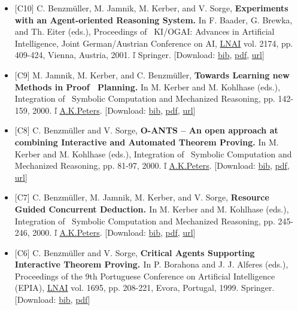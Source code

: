 \documentclass{article}
\newcommand{\tmtextbf}[1]{{\bfseries{#1}}}
\newenvironment{itemizedot}{\begin{itemize} \renewcommand{\labelitemi}{$\bullet$}\renewcommand{\labelitemii}{$\bullet$}\renewcommand{\labelitemiii}{$\bullet$}\renewcommand{\labelitemiv}{$\bullet$}}{\end{itemize}}
\begin{document}
\begin{itemizedot}
  \item {\small [C10] C. Benzm\"uller, M. Jamnik, M. Kerber, and V. Sorge,
  \tmtextbf{Experiments with an Agent-oriented Reasoning System.}} {\small In
  F. Baader, G. Brewka, and Th. Eiter (eds.), Proceedings of \ KI/OGAI:
  Advances in Artificial Intelligence, Joint German/Austrian Conference on AI,
  \href{http://www.springer.de/comp/lncs/}{LNAI} vol. 2174, pp. 409-424,
  Vienna, Austria, 2001.  \v{l}  Springer.} {\color{grey} [Download: {\small
  \href{../papers/C10.bib}{bib}, \href{../papers/C10.pdf}{pdf}}, {\small
  \href{http://link.springer.de/link/service/series/0558/bibs/2174/21740409.htm}{url}}]}
  
  \item {\small [C9] M. Jamnik, M. Kerber, and C. Benzm\"uller,
  \tmtextbf{Towards Learning new Methods in Proof \ Planning.}} {\small In M.
  Kerber and M. Kohlhase (eds.), Integration of \ Symbolic Computation and
  Mechanized Reasoning, pp. 142-159, 2000.  \v{l}
  \href{http://www.akpeters.com/}{A.K.Peters}.} {\color{grey} [Download:
  {\small \href{../papers/C9.bib}{bib}, \href{../papers/C9.pdf}{pdf}}, {\small
  \href{http://www.akpeters.com/product.asp?ProdCode=145}{url}}]}
  
  \item {\small [C8] C. Benzm\"uller and V. Sorge, \tmtextbf{O-ANTS -- An open
  approach at combining Interactive and Automated Theorem Proving.}} {\small
  In M. Kerber and M. Kohlhase (eds.), Integration of \ Symbolic Computation
  and Mechanized Reasoning, pp. 81-97, 2000.  \v{l}
  \href{http://www.akpeters.com/}{A.K.Peters}.} {\color{grey} [Download:
  {\small \href{../papers/C8.bib}{bib}, \href{../papers/C8.pdf}{pdf}}, {\small
  \href{http://www.akpeters.com/product.asp?ProdCode=145}{url}}]}
  
  \item {\small [C7] C. Benzm\"uller, M. Jamnik, M. Kerber, and V. Sorge,
  \tmtextbf{Resource Guided Concurrent Deduction. }In M. Kerber and M.
  Kohlhase (eds.), Integration of \ Symbolic Computation and Mechanized
  Reasoning, pp. 245-246, 2000.  \v{l}
  \href{http://www.akpeters.com/}{A.K.Peters}.} {\color{grey} [Download:
  {\small \href{../papers/C7.bib}{bib}, \href{../papers/C7.pdf}{pdf}}, {\small
  \href{http://www.akpeters.com/product.asp?ProdCode=145}{url}}]}
  
  \item {\small [C6] C. Benzm\"uller and V. Sorge, \tmtextbf{Critical Agents
  Supporting Interactive Theorem Proving. }In P. Borahona and J. J. Alferes
  (eds.), Proceedings of the 9th Portuguese Conference on Artificial
  Intelligence (EPIA), \href{http://www.springer.de/comp/lncs/}{LNAI} vol.
  1695, pp. 208-221, Evora, Portugal, 1999. Springer.} {\color{grey}
  [Download: {\small \href{../papers/C6.bib}{bib},
  \href{../papers/C6.pdf}{pdf}}]}
  

\end{itemizedot}
\end{document}
